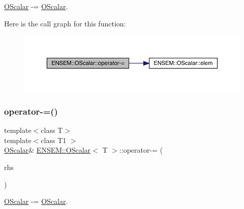 \mbox{\hyperlink{classENSEM_1_1OScalar}{O\+Scalar}} -\/= \mbox{\hyperlink{classENSEM_1_1OScalar}{O\+Scalar}}. 

Here is the call graph for this function\+:
\nopagebreak
\begin{figure}[H]
\begin{center}
\leavevmode
\includegraphics[width=350pt]{da/d80/classENSEM_1_1OScalar_a4d240e95768b5a0c9537b32d00d60ac5_cgraph}
\end{center}
\end{figure}
\mbox{\label{classENSEM_1_1OScalar_a4d240e95768b5a0c9537b32d00d60ac5}} 
\subsubsection{\texorpdfstring{operator-\/=()}{operator-=()}\hspace{0.1cm}{\footnotesize\ttfamily [2/3]}}
{\footnotesize\ttfamily template$<$class T$>$ \\
template$<$class T1 $>$ \\
\mbox{\hyperlink{classENSEM_1_1OScalar}{O\+Scalar}}\& \mbox{\hyperlink{classENSEM_1_1OScalar}{E\+N\+S\+E\+M\+::\+O\+Scalar}}$<$ T $>$\+::operator-\/= (\begin{DoxyParamCaption}\item[{const \mbox{\hyperlink{classENSEM_1_1OScalar}{O\+Scalar}}$<$ T1 $>$ \&}]{rhs }\end{DoxyParamCaption})\hspace{0.3cm}{\ttfamily [inline]}}



\mbox{\hyperlink{classENSEM_1_1OScalar}{O\+Scalar}} -\/= \mbox{\hyperlink{classENSEM_1_1OScalar}{O\+Scalar}}. 

